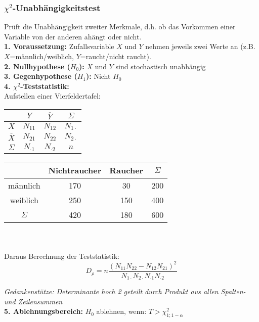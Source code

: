 \subsubsection{\(\chi^2\)-Unabhängigkeitstest}

Prüft die Unabhängigkeit zweiter Merkmale, d.h. ob das Vorkommen einer Variable von der anderen ahängt oder nicht.\\


\textbf{1. Voraussetzung:} Zufallsvariable \(X\) und \(Y\) nehmen jeweils zwei Werte an (z.B. \(X\)=männlich/weiblich, \(Y\)=raucht/nicht raucht).\\

\textbf{2. Nullhypothese (\(H_0\)):} \(X\) und \(Y\) sind stochastisch unabhängig\\

\textbf{3. Gegenhypothese (\(H_1\)):} Nicht \(H_0\)\\

\textbf{4. \(\chi^2\)-Teststatistik:}\\

Aufstellen einer Vierfeldertafel:\\

\begin{minipage}[c]{.4\textwidth}
    \centering
    \begin{tabular}{c|c|c|c}
                   & $Y$           & $\overline{Y}$ & $\Sigma$         \\ 
                   \hline
    $X$            & \(N_{11}\)    & \(N_{12}\)     & \(N_{1 \cdot} \) \\ 
    \hline
    $\overline{X}$ & \(N_{21}\)    & \(N_{22}\)     & \(N_{2\cdot} \)  \\ 
    \hline
    $\Sigma$       & $N_{\cdot 1}$ & $N_{\cdot 2}$  & $n$
    \end{tabular}
\end{minipage}
\begin{minipage}[c]{.6\textwidth}
    \centering
    \begin{tabular}{c|c|c|c}
             & Nichtraucher & Raucher & $\Sigma$ \\ 
    \hline
    männlich & 170          & 30      & 200 \\
    \hline
    weiblich & 250          & 150     & 400  \\
    \hline
    $\Sigma$ & 420          & 180     & 600
    \end{tabular}
\end{minipage}\\\\

Daraus Berechnung der Teststatistik:
\begin{equation*}
    D_{\rho} = n \frac{(N_{11}N_{22}-N_{12}N_{21})^2}{N_{1\cdot}N_{2\cdot}N_{\cdot1}N_{\cdot2}}
\end{equation*}

\emph{Gedankenstütze: Determinante hoch 2 geteilt durch Produkt aus allen Spalten- und Zeilensummen}\\

\textbf{5. Ablehnungsbereich:} \(H_0\) ablehnen, wenn:  \(T > \chi^2_{1;1-\alpha}\)\\
